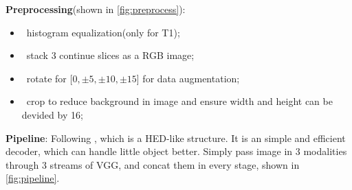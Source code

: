 \documentclass{article}
\begin{document}
\begin{spacing}{1.4}
\textbf{Preprocessing}(shown in \ref{fig:preprocess}):
\begin{itemize}
    \item ~histogram equalization(only for T1);
    \item ~stack 3 continue slices as a RGB image;
    \item ~rotate for [$0,\pm 5,\pm 10,\pm 15$] for data augmentation;
    \item ~crop to reduce background in image and ensure width and height can be devided by 16;
\end{itemize}


\textbf{Pipeline}:
Following \cite{xu2017neonatal}, which is a HED-like\cite{Xie2016Holistically} structure. 
It is an simple and efficient decoder, which can handle little object better. 
Simply pass image in 3 modalities through 3 streams of VGG, and concat them in every stage, shown in \ref{fig:pipeline}. 


\end{spacing}
\end{document}
